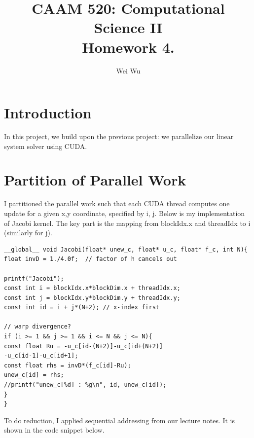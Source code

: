 \documentclass{amsart} %
\title{CAAM 520: Computational Science II \\
Homework 4.}
\author{Wei Wu}
\begin{document}

\maketitle

\section{Introduction} 

In this project, we build upon the previous project: we parallelize our linear system solver using CUDA. 

\section{Partition of Parallel Work}

I partitioned the parallel work such that each CUDA thread computes one update for a given x,y coordinate, specified by i, j. Below is my implementation of Jacobi kernel. The key part is the mapping from  blockIdx.x and threadIdx to i (similarly for j).    

\begin{lstlisting}
__global__ void Jacobi(float* unew_c, float* u_c, float* f_c, int N){
float invD = 1./4.0f;  // factor of h cancels out

printf("Jacobi");
const int i = blockIdx.x*blockDim.x + threadIdx.x;
const int j = blockIdx.y*blockDim.y + threadIdx.y;
const int id = i + j*(N+2); // x-index first

// warp divergence?  
if (i >= 1 && j >= 1 && i <= N && j <= N){
const float Ru = -u_c[id-(N+2)]-u_c[id+(N+2)]
-u_c[id-1]-u_c[id+1];
const float rhs = invD*(f_c[id]-Ru);
unew_c[id] = rhs;
//printf("unew_c[%d] : %g\n", id, unew_c[id]);
}
}
\end{lstlisting}   

To do reduction, I applied sequential addressing from our lecture notes. It is shown in the code snippet below.
\end{document}
